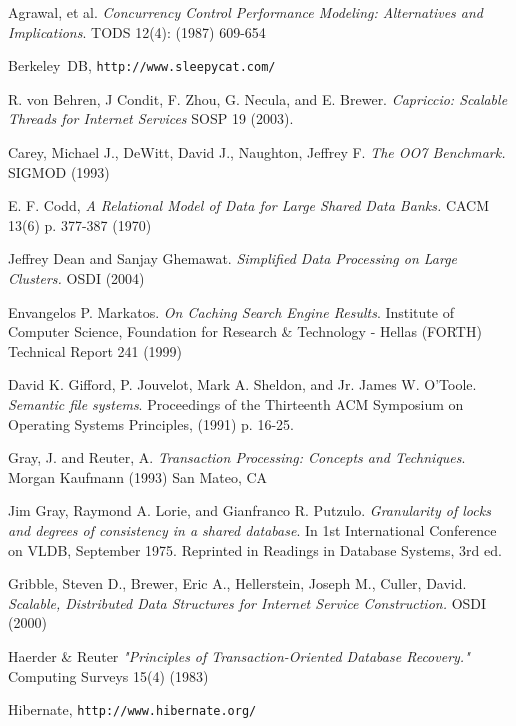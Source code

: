 \documentclass[10pt,letterpaper,twocolumn,english]{article}
\begin{document}
\begin{thebibliography}{99}
\begin{small}
 Agrawal, et al. {\em Concurrency Control Performance Modeling: Alternatives and Implications}. TODS 12(4): (1987) 609-654

 Berkeley~DB, {\tt http://www.sleepycat.com/}

 R. von Behren, J Condit, F. Zhou, G. Necula, and E. Brewer. {\em Capriccio: Scalable Threads for Internet Services} SOSP 19 (2003).

 Carey, Michael J., DeWitt, David J., Naughton, Jeffrey F. {\em The OO7 Benchmark.} SIGMOD (1993)

 E. F. Codd, {\em A Relational Model of Data for Large Shared Data Banks.} CACM 13(6) p. 377-387 (1970)

 Jeffrey Dean and Sanjay Ghemawat. {\em Simplified Data Processing on Large Clusters. } OSDI (2004)

 Envangelos P. Markatos. {\em On Caching Search Engine Results}.  Institute of Computer Science, Foundation for Research \& Technology - Hellas (FORTH) Technical Report 241 (1999)

 David K. Gifford, P. Jouvelot, Mark A. Sheldon, and Jr. James W. O'Toole. {\em Semantic file systems}. Proceedings of the Thirteenth ACM Symposium on Operating Systems Principles, (1991) p. 16-25.

 Gray, J. and Reuter, A. {\em Transaction Processing: Concepts and Techniques}. Morgan Kaufmann (1993) San Mateo, CA

 Jim Gray, Raymond A. Lorie, and Gianfranco R. Putzulo. {\em Granularity of locks and degrees of consistency in a shared database}. In 1st International Conference on VLDB, September 1975. Reprinted in Readings in Database Systems, 3rd ed.

  Gribble, Steven D., Brewer, Eric A., Hellerstein, Joseph M., Culler, David.  {\em Scalable, Distributed Data Structures for Internet Service Construction. } OSDI (2000)

 Haerder \& Reuter {\em "Principles of Transaction-Oriented Database Recovery." } Computing Surveys 15(4) (1983) %

 Hibernate, {\tt http://www.hibernate.org/}


\end{small}
\end{thebibliography}
\end{document}
